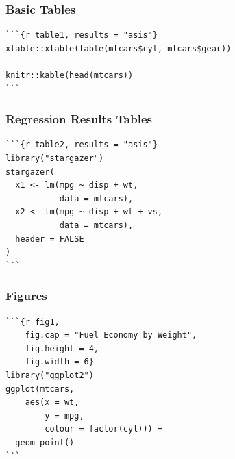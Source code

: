 \documentclass[14pt]{beamer}
\begin{document}
\begin{frame}[fragile]
\frametitle{Basic Tables}

\small

\begin{verbatim}
```{r table1, results = "asis"}
xtable::xtable(table(mtcars$cyl, mtcars$gear))

knitr::kable(head(mtcars))
```
\end{verbatim}
\end{frame}


\begin{frame}[fragile]
\frametitle{Regression Results Tables}
\begin{verbatim}
```{r table2, results = "asis"}
library("stargazer")
stargazer(
  x1 <- lm(mpg ~ disp + wt, 
           data = mtcars),
  x2 <- lm(mpg ~ disp + wt + vs, 
           data = mtcars),
  header = FALSE
)
```
\end{verbatim}
\end{frame}


\begin{frame}[fragile]
\frametitle{Figures}	
\begin{verbatim}
```{r fig1, 
    fig.cap = "Fuel Economy by Weight",
    fig.height = 4,
    fig.width = 6}
library("ggplot2")
ggplot(mtcars, 
    aes(x = wt, 
        y = mpg,
        colour = factor(cyl))) + 
  geom_point()
```
\end{verbatim}
\end{frame}




\end{document}
